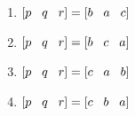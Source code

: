 \documentclass[journal,12pt,twocolumn]{IEEEtran}
\begin{document}
\begin{enumerate}
\begin{enumerate}
\item $[p\hspace{3mm}q\hspace{3mm}r]=[b\hspace{3mm}a\hspace{3mm}c]$
\item $[p\hspace{3mm}q\hspace{3mm}r]=[b\hspace{3mm}c\hspace{3mm}a]$
\item $[p\hspace{3mm}q\hspace{3mm}r]=[c\hspace{3mm}a\hspace{3mm}b]$
\item $[p\hspace{3mm}q\hspace{3mm}r]=[c\hspace{3mm}b\hspace{3mm}a]$
\end{enumerate}


\end{enumerate}
\end{document}
